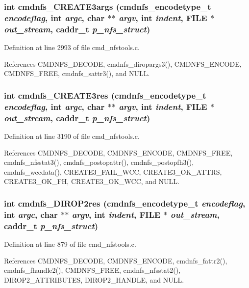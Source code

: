 \subsubsection{\setlength{\rightskip}{0pt plus 5cm}int cmdnfs\_\-CREATE3args ({\bf cmdnfs\_\-encodetype\_\-t} {\em encodeflag}, int {\em argc}, char $\ast$$\ast$ {\em argv}, int {\em indent}, FILE $\ast$ {\em out\_\-stream}, caddr\_\-t {\em p\_\-nfs\_\-struct})}\label{cmd__nfstools_8h_a50}




Definition at line 2993 of file cmd\_\-nfstools.c.

References CMDNFS\_\-DECODE, cmdnfs\_\-diropargs3(), CMDNFS\_\-ENCODE, CMDNFS\_\-FREE, cmdnfs\_\-sattr3(), and NULL.
\subsubsection{\setlength{\rightskip}{0pt plus 5cm}int cmdnfs\_\-CREATE3res ({\bf cmdnfs\_\-encodetype\_\-t} {\em encodeflag}, int {\em argc}, char $\ast$$\ast$ {\em argv}, int {\em indent}, FILE $\ast$ {\em out\_\-stream}, caddr\_\-t {\em p\_\-nfs\_\-struct})}\label{cmd__nfstools_8h_a51}




Definition at line 3190 of file cmd\_\-nfstools.c.

References CMDNFS\_\-DECODE, CMDNFS\_\-ENCODE, CMDNFS\_\-FREE, cmdnfs\_\-nfsstat3(), cmdnfs\_\-postopattr(), cmdnfs\_\-postopfh3(), cmdnfs\_\-wccdata(), CREATE3\_\-FAIL\_\-WCC, CREATE3\_\-OK\_\-ATTRS, CREATE3\_\-OK\_\-FH, CREATE3\_\-OK\_\-WCC, and NULL.
\subsubsection{\setlength{\rightskip}{0pt plus 5cm}int cmdnfs\_\-DIROP2res ({\bf cmdnfs\_\-encodetype\_\-t} {\em encodeflag}, int {\em argc}, char $\ast$$\ast$ {\em argv}, int {\em indent}, FILE $\ast$ {\em out\_\-stream}, caddr\_\-t {\em p\_\-nfs\_\-struct})}\label{cmd__nfstools_8h_a25}




Definition at line 879 of file cmd\_\-nfstools.c.

References CMDNFS\_\-DECODE, CMDNFS\_\-ENCODE, cmdnfs\_\-fattr2(), cmdnfs\_\-fhandle2(), CMDNFS\_\-FREE, cmdnfs\_\-nfsstat2(), DIROP2\_\-ATTRIBUTES, DIROP2\_\-HANDLE, and NULL.
